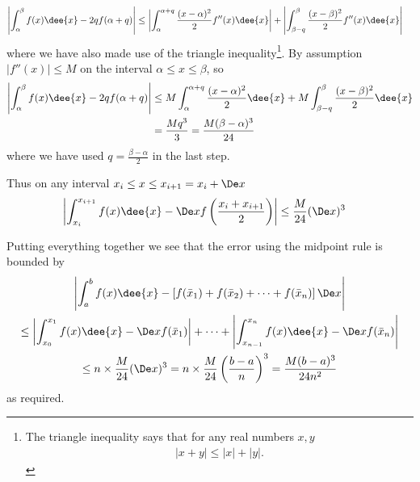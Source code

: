 \begin{align*}
 \left| \int_\alpha^\beta f(x)\dee{x} - 2q f(\alpha+q) \right|
  &\leq \left| \int_\alpha^{\alpha+q} \frac{(x-\alpha)^2}{2}f''(x)\dee{x}
\right|
  + \left|\int_{\beta-q}^\beta \frac{(x-\beta)^2}{2}f''(x)\dee{x}\right|
\end{align*}
where we have also made use of the triangle inequality\footnote{The
triangle inequality says that for any real numbers $x,y$
\begin{align*}
  |x+y| \leq |x| + |y|.
\end{align*}
}. By assumption $|f''(x)| \leq M$ on the interval $\alpha \leq x \leq \beta$,
so
\begin{align*}
  \left| \int_\alpha^\beta f(x)\dee{x} - 2q f(\alpha+q) \right|
  & \leq M \int_\alpha^{\alpha+q} \frac{(x-\alpha)^2}{2} \dee{x}
  + M \int_{\beta-q}^\beta \frac{(x-\beta)^2}{2} \dee{x}\\
  &= \frac{Mq^3}{3} = \frac{M(\beta-\alpha)^3}{24}
\end{align*}
where we have used $q = \frac{\beta-\alpha}{2}$ in the last step.

Thus on any interval $x_i \leq x \leq x_{i+1}=x_i+\De x$
\begin{align*}
\left| \int_{x_i}^{x_{i+1}} f(x)\dee{x} - \De x f\left(\frac{x_i+x_{i+1}}{2}\right)
\right|
& \leq \frac{M}{24} ( \De x)^3
\end{align*}

Putting everything together we see that the error using the midpoint rule is bounded by
\begin{multline*}
 \left| \int_a^b f(x) \dee{x} - \left[
f(\bar x_1)+f(\bar x_2)+\cdots +f(\bar x_n)
\right]\De x \right|
\\
\leq
\left| \int_{x_0}^{x_1} f(x)\dee{x} - \De x f(\bar x_1) \right|
+\cdots+
\left| \int_{x_{n-1}}^{x_n} f(x)\dee{x} - \De x f(\bar x_n) \right|
\\
 \leq n \times \frac{M}{24} ( \De x)^3
= n \times \frac{M}{24} \left( \frac{b-a}{n}\right)^3
= \frac{M(b-a)^3}{24 n^2}
\end{multline*}
as required.

